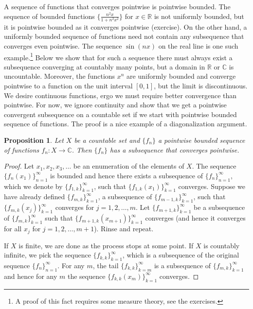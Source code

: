 \documentclass[12pt,openany]{book}
\newcommand{\C}{{\mathbb{C}}}
\newcommand{\R}{{\mathbb{R}}}
\theoremstyle{plain}
\newtheorem{prop}[thm]{Proposition}
\theoremstyle{remark}
\theoremstyle{definition}
\theoremstyle{exercise}
\theoremstyle{example}
\begin{document}
A sequence of functions that converges pointwise is pointwise bounded.
The sequence of bounded functions $\bigl\{ \frac{n^2x}{1+n^2x^2} \bigr\}$
for $x \in \R$
is not uniformly bounded, but it is pointwise bounded as it converges
pointwise (exercise).
On the other hand,
a uniformly bounded sequence of functions need
not contain any subsequence that converges even pointwise.
The sequence $\sin(nx)$ on the real line is one such example.\footnote{%
A proof of this fact requires some measure theory, see the exercises.}
Below we show that for such a sequence there must always exist
a subsequence converging at countably
many points, but a domain in $\R$ or $\C$ is uncountable.
Moreover,
the functions $x^n$ are uniformly bounded
and converge pointwise to a function on the unit interval $[0,1]$, but the limit
is discontinuous.  We desire continuous
functions, ergo we must require better convergence than pointwise.  For now,
we ignore continuity and show that we get a pointwise
convergent subsequence on a countable set
if we start with pointwise bounded sequence of functions.
The proof is a nice example of a diagonalization argument.

\begin{prop} \label{prop:subsequenceoncountableX}
Let $X$ be a countable set and $\{ f_n \}$ a pointwise bounded
sequence of functions $f_n \colon X \to \C$.
Then $\{ f_n \}$ has a subsequence that converges pointwise.
\end{prop}

\begin{proof}
Let $x_1,x_2,x_3,\ldots$ be an enumeration of the elements of $X$.
The sequence $\{ f_n(x_1) \}_{n=1}^\infty$ is bounded and hence
there exists a subsequence of $\{ f_n \}_{n=1}^{\infty}$, which we denote by
$\{ f_{1,k} \}_{k=1}^\infty$,
such that
$\{ f_{1,k}(x_1) \}_{k=1}^\infty$ converges.
Suppose we have already defined $\{ f_{m,k} \}_{k=1}^\infty$,
a subsequence of $\{ f_{m-1,k} \}_{k=1}^\infty$,
such that
$\{ f_{m,k}(x_j) \}_{k=1}^\infty$ converges for $j=1,2,\ldots,m$.
Let $\{ f_{m+1,k} \}_{k=1}^\infty$ be a subsequence of
$\{ f_{m,k} \}_{k=1}^\infty$
such that
$\{ f_{m+1,k}(x_{m+1}) \}_{k=1}^\infty$ converges (and hence it converges for all
$x_j$ for $j=1,2,\ldots,m+1$).  Rinse and repeat.

If $X$ is finite, we are done as the process stops at some point.
If $X$ is countably infinite,
we pick the sequence
$\{ f_{k,k} \}_{k=1}^\infty$,
which is a subsequence of the original sequence $\{ f_n \}_{n=1}^\infty$.
For any $m$, the tail $\{ f_{k,k} \}_{k=m}^\infty$ is a subsequence of $\{ f_{m,k}
\}_{k=1}^\infty$
and hence for any $m$ the sequence $\{ f_{k,k}(x_m) \}_{k=1}^\infty$ converges.
\end{proof}
\end{document}

